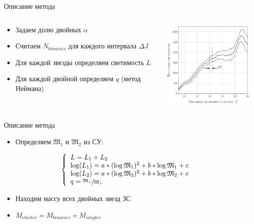 \documentclass[pdf]{beamer}
\begin{document}
	\begin{frame}{Описание метода}
		\begin{columns}
			\begin{column}{0.5\textwidth}
				\begin{itemize}
				\item Задаем долю двойных $\alpha$
				\item Считаем $N_{binaries}$ для каждого интервала $\Delta J$
				\item Для каждой звезды определяем светимость $L$ 
				\item Для каждой двойной определяем $q$ (метод Неймана)
				\end{itemize}
			\end{column}
			
			\begin{column}{0.4\textwidth}
				\vspace{0.5cm}	
    			\includegraphics[width=5cm]{images/LF}
			\end{column}
		\end{columns}

		\centering
		\pause

	\end{frame}
	
	\begin{frame}{Описание метода}
		\begin{itemize}
			\item Определяем $\mathfrak{M_1}$ и $\mathfrak{M_2}$ из СУ:
		\end{itemize}
		
		\[		
		\left\{ 
			\begin{array}{l}
				L=L_1+L_2 \\
				\log(L_1)=a*(\log\mathfrak{M}_1)^2+b*\log\mathfrak{M}_1+c\\
				\log(L_2)=a*(\log\mathfrak{M}_2)^2+b*\log\mathfrak{M}_2+c \\
				q = \sfrac{\mathfrak{M_2}}{\mathfrak{M_1}}
			\end{array}
		\right.
		\]
		\begin{itemize}
			\item Находим массу всех двойных звезд ЗС
			\item $M_{cluster} = M_{binaries} + M_{singles}$
		\end{itemize}
	\end{frame}
\end{document}
